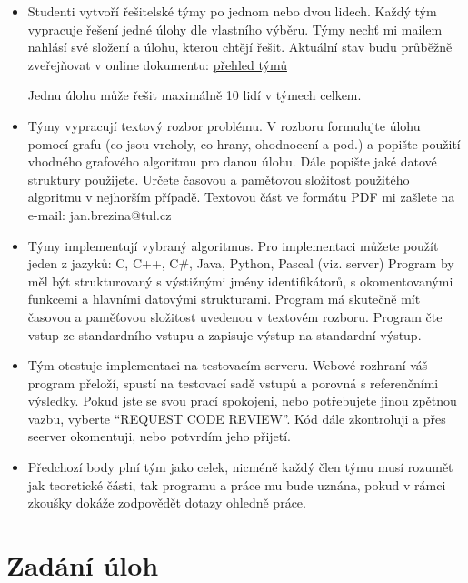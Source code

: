 \documentclass[a4paper,10pt]{article}
\begin{document}
  \begin{itemize}
  \item   Studenti vytvoří řešitelské týmy po jednom nebo dvou lidech. Každý tým vypracuje řešení jedné úlohy dle vlastního výběru. Týmy nechť mi mailem nahlásí své složení a úlohu, kterou chtějí řešit.  Aktuální stav budu průběžně zveřejňovat v online dokumentu:
 \href{https://docs.google.com/spreadsheets/d/1351X8wRr24RCTDonNWbDcbJwNYJDtrtG3udH7RnDAjA}{přehled týmů}
 
 Jednu úlohu může řešit maximálně 10 lidí v týmech celkem.

  \item Týmy vypracují textový rozbor problému. V rozboru formulujte úlohu  pomocí grafu (co jsou vrcholy, co hrany, ohodnocení a pod.)
  a popište použití vhodného grafového algoritmu pro danou úlohu. Dále popište jaké datové struktury použijete. 
  Určete časovou a paměťovou složitost použitého algoritmu v nejhorším případě. 
  Textovou část ve formátu PDF mi zašlete na e-mail: jan.brezina@tul.cz 
         

  \item  Týmy implementují vybraný algoritmus. Pro implementaci můžete použít jeden z jazyků: C, C++, C\#, Java, Python, Pascal (viz. server)
   Program by měl být strukturovaný s výstižnými jmény identifikátorů, s okomentovanými funkcemi a hlavními datovými strukturami. 
   Program má skutečně mít časovou a paměťovou složitost uvedenou v textovém rozboru. Program čte vstup ze standardního vstupu a zapisuje výstup na standardní výstup.
  
  \item  Tým otestuje implementaci na testovacím serveru. Webové rozhraní váš program přeloží, 
        spustí na testovací sadě vstupů a porovná s referenčními výsledky. Pokud jste se svou prací spokojeni, nebo potřebujete jinou zpětnou vazbu, vyberte ``REQUEST CODE REVIEW''. Kód dále zkontroluji a přes seerver okomentuji, nebo potvrdím jeho přijetí.

  \item  Předchozí body plní tým jako celek, nicméně každý člen týmu musí rozumět jak teoretické části, tak programu a práce mu bude uznána, pokud v rámci zkoušky dokáže zodpovědět dotazy ohledně práce.
 \end{itemize}

\section{Zadání úloh}
\end{document}
